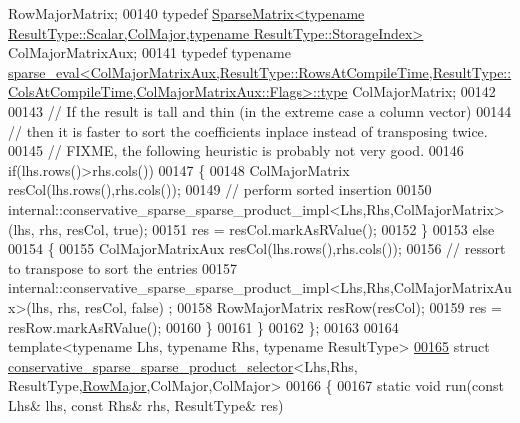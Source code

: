 \begin{DoxyCode}
       RowMajorMatrix;
00140     \textcolor{keyword}{typedef} 
      \hyperlink{group___sparse_core___module_class_eigen_1_1_sparse_matrix}{SparseMatrix<typename ResultType::Scalar,ColMajor,typename ResultType::StorageIndex>}
       ColMajorMatrixAux;
00141     \textcolor{keyword}{typedef} \textcolor{keyword}{typename} 
      \hyperlink{group___sparse_core___module_class_eigen_1_1_sparse_matrix}{
      sparse\_eval<ColMajorMatrixAux,ResultType::RowsAtCompileTime,ResultType::ColsAtCompileTime,ColMajorMatrixAux::Flags>::type}
       ColMajorMatrix;
00142     
00143     \textcolor{comment}{// If the result is tall and thin (in the extreme case a column vector)}
00144     \textcolor{comment}{// then it is faster to sort the coefficients inplace instead of transposing twice.}
00145     \textcolor{comment}{// FIXME, the following heuristic is probably not very good.}
00146     \textcolor{keywordflow}{if}(lhs.rows()>rhs.cols())
00147     \{
00148       ColMajorMatrix resCol(lhs.rows(),rhs.cols());
00149       \textcolor{comment}{// perform sorted insertion}
00150       internal::conservative\_sparse\_sparse\_product\_impl<Lhs,Rhs,ColMajorMatrix>(lhs, rhs, resCol, \textcolor{keyword}{true});
00151       res = resCol.markAsRValue();
00152     \}
00153     \textcolor{keywordflow}{else}
00154     \{
00155       ColMajorMatrixAux resCol(lhs.rows(),rhs.cols());
00156       \textcolor{comment}{// ressort to transpose to sort the entries}
00157       internal::conservative\_sparse\_sparse\_product\_impl<Lhs,Rhs,ColMajorMatrixAux>(lhs, rhs, resCol, \textcolor{keyword}{false})
      ;
00158       RowMajorMatrix resRow(resCol);
00159       res = resRow.markAsRValue();
00160     \}
00161   \}
00162 \};
00163 
00164 \textcolor{keyword}{template}<\textcolor{keyword}{typename} Lhs, \textcolor{keyword}{typename} Rhs, \textcolor{keyword}{typename} ResultType>
\hyperlink{struct_eigen_1_1internal_1_1conservative__sparse__sparse__product__selector_3_01_lhs_00_01_rhs_0434d91bd03f3817d20ac2e65c68dd100}{00165} \textcolor{keyword}{struct }\hyperlink{struct_eigen_1_1internal_1_1conservative__sparse__sparse__product__selector}{conservative\_sparse\_sparse\_product\_selector}<Lhs,Rhs,
      ResultType,\hyperlink{group__enums_ggaacded1a18ae58b0f554751f6cdf9eb13acfcde9cd8677c5f7caf6bd603666aae3}{RowMajor},ColMajor,ColMajor>
00166 \{
00167   \textcolor{keyword}{static} \textcolor{keywordtype}{void} run(\textcolor{keyword}{const} Lhs& lhs, \textcolor{keyword}{const} Rhs& rhs, ResultType& res)

\end{DoxyCode}
